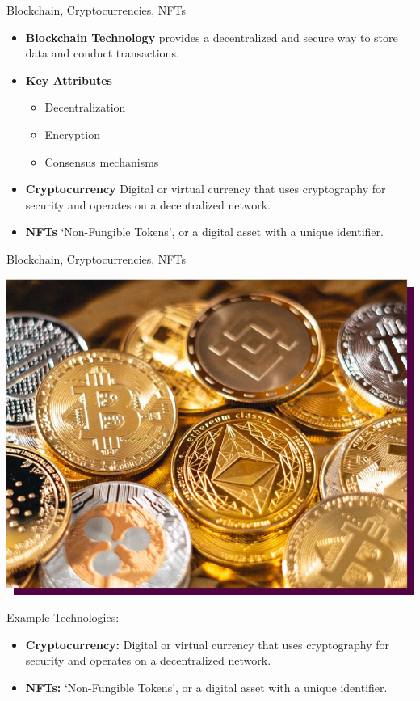 \documentclass[nobackground,dvipsnames,table]{beamer}
\begin{document}
\begin{frame}{Blockchain, Cryptocurrencies, NFTs}

    \begin{itemize}
        \item \textbf{Blockchain Technology} provides a decentralized and secure way to store data and conduct transactions.
        \item \textbf{Key Attributes} 
        \begin{itemize}
            \item Decentralization
            \item Encryption
            \item Consensus mechanisms
        \end{itemize}
        \item \textbf{Cryptocurrency} Digital or virtual currency that uses cryptography for security and operates on a decentralized network.
        \item \textbf{NFTs} 
        ‘Non-Fungible Tokens’, or  a digital asset with a unique identifier.
    \end{itemize}


\end{frame}


\begin{frame}{Blockchain, Cryptocurrencies, NFTs}

\hspace*{-2ex}
\includegraphics[width=.5\textwidth]{img/fig9.jpg}
\hfill 
\begin{minipage}[b]{0.49\textwidth}
    \small{
    Example Technologies:
        \begin{itemize} 
            \item \textbf{Cryptocurrency:} Digital or virtual currency that uses cryptography for security and operates on a decentralized network.
            \item  \textbf{NFTs:} ‘Non-Fungible Tokens’, or  a digital asset with a unique identifier.
        \end{itemize}
    }
\end{minipage}

\end{frame}
\end{document}
